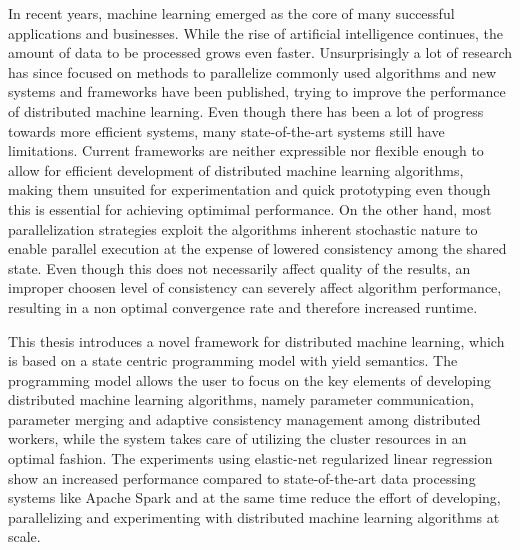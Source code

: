 % 
% 
%
In recent years, machine learning emerged as the core of many successful applications and businesses.
While the rise of artificial intelligence continues, the amount of data to be processed grows even faster.
Unsurprisingly a lot of research has since focused on methods to parallelize commonly used algorithms and new systems and frameworks have been published, trying to improve the performance of distributed machine learning.
Even though there has been a lot of progress towards more efficient systems, many state-of-the-art systems still have limitations.
Current frameworks are neither expressible nor flexible enough to allow for efficient development of distributed machine learning algorithms, making them unsuited for experimentation and quick prototyping even though this is essential for achieving optimimal performance.
On the other hand, most parallelization strategies exploit the algorithms inherent stochastic nature to enable parallel execution at the expense of lowered consistency among the shared state.
Even though this does not necessarily affect quality of the results, an improper choosen level of consistency can severely affect algorithm performance, resulting in a non optimal convergence rate and therefore increased runtime.

This thesis introduces a novel framework for distributed machine learning, which is based on a state centric programming model with yield semantics.
The programming model allows the user to focus on the key elements of developing distributed machine learning algorithms, namely parameter communication, parameter merging and adaptive consistency management among distributed workers, while the system takes care of utilizing the cluster resources in an optimal fashion.
The experiments using elastic-net regularized linear regression show an increased performance compared to state-of-the-art data processing systems like Apache Spark and at the same time reduce the effort of developing, parallelizing and experimenting with distributed machine learning algorithms at scale.

